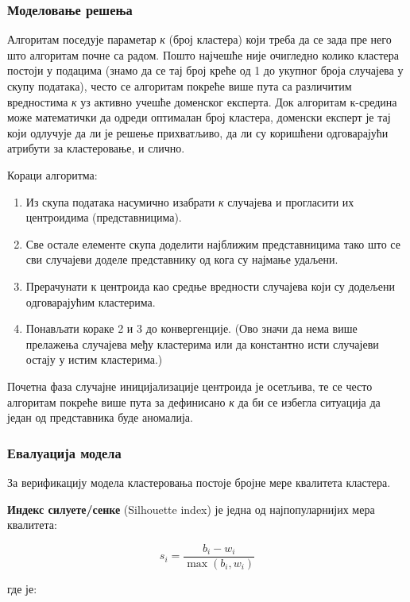 \subsubsection{Моделовање решења}
Алгоритам поседује параметар \textit{к} (број кластера) који треба да се зада пре него што алгоритам почне са радом. Пошто најчешће није очигледно колико кластера постоји у подацима (знамо да се тај број креће од 1 до укупног броја случајева у скупу података), често се алгоритам покреће више пута са различитим вредностима \textit{к} уз активно учешће доменског експерта. Док алгоритам к-средина може математички да одреди оптималан број кластера, доменски експерт је тај који одлучује да ли је решење прихватљиво, да ли су коришћени одговарајући атрибути за кластеровање, и слично.

Кораци алгоритма:

\begin{enumerate}
  \item Из скупа података насумично изабрати \textit{к} случајева и прогласити их центроидима (представницима).
  \item Све остале елементе скупа доделити најближим представницима тако што се сви случајеви доделе представнику од кога су најмање удаљени.
  \item Прерачунати к центроида као средње вредности случајева који су додељени одговарајућим кластерима.
  \item Понављати кораке 2 и 3 до конвергенције. (Ово значи да нема више прелажења случајева међу кластерима или да константно исти случајеви остају у истим кластерима.)
\end{enumerate}
Почетна фаза случајне иницијализације центроида је осетљива, те се често алгоритам покреће више пута за дефинисано \textit{к} да би се избегла ситуација да један од представника буде аномалија.

\subsubsection{Евалуација модела}
За верификацију модела кластеровања постоје бројне мере квалитета кластера.

\textbf{Индекс силуете/сенке} (Silhouette index) је једна од најпопуларнијих мера квалитета:

\[
s_{i}=\frac{b_{i}-w_{i}}{\max(b_{i},w_{i})}
\]

где је:

